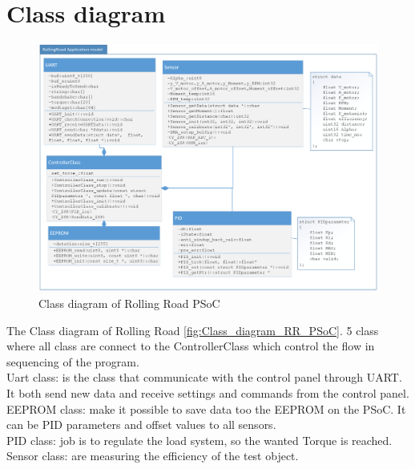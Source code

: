 \section{Class diagram}



\begin{figure}[H]
	\centering
	\includegraphics [width=6in]{Software/Pictures/klassediagram.png}
	\caption{Class diagram of Rolling Road PSoC}
	\label{fig:Class_diagram_RR_PSoC}
\end{figure}

The Class diagram of Rolling Road \vref{fig:Class_diagram_RR_PSoC}. 5 class where all class are connect to the ControllerClass which control the flow in sequencing of the program.\\
Uart class: is the class that communicate with the control panel through UART. It both send new data and receive settings and commands from the control panel. \\
EEPROM class: make it possible to save data too the EEPROM on the PSoC. It can be PID parameters and offset values to all sensors.\\
PID class: job is to regulate the load system, so the wanted Torque is reached. \\
Sensor class: are measuring the efficiency of the test object.

